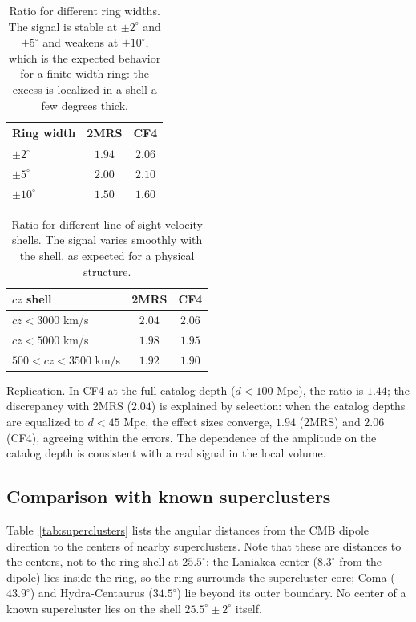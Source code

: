 \documentclass[11pt,a4paper]{article}
\begin{document}
\begin{table}[H]
\centering
\begin{tabular}{lcc}
\toprule
\textbf{Ring width} & \textbf{2MRS} & \textbf{CF4} \\
\midrule
\(\pm 2^\circ\) & \(1.94\) & \(2.06\) \\
\(\pm 5^\circ\) & \(2.00\) & \(2.10\) \\
\(\pm 10^\circ\) & \(1.50\) & \(1.60\) \\
\bottomrule
\end{tabular}
\caption{Ratio for different ring widths. The signal is stable at
\(\pm 2^\circ\) and \(\pm 5^\circ\) and weakens at \(\pm 10^\circ\), which is the
expected behavior for a finite-width ring: the excess is localized in a shell
a few degrees thick.}
\label{tab:bin}
\end{table}

\begin{table}[H]
\centering
\begin{tabular}{lcc}
\toprule
\textbf{\(cz\) shell} & \textbf{2MRS} & \textbf{CF4} \\
\midrule
\(cz < 3000\) km/s & \(2.04\) & \(2.06\) \\
\(cz < 5000\) km/s & \(1.98\) & \(1.95\) \\
\(500 < cz < 3500\) km/s & \(1.92\) & \(1.90\) \\
\bottomrule
\end{tabular}
\caption{Ratio for different line-of-sight velocity shells. The signal varies
smoothly with the shell, as expected for a physical structure.}
\label{tab:cz}
\end{table}

Replication. In CF4 at the full catalog depth (\(d < 100\) Mpc), the ratio is
\(1.44\); the discrepancy with 2MRS (\(2.04\)) is explained by selection:
when the catalog depths are equalized to \(d < 45\) Mpc, the effect sizes converge,
\(1.94\) (2MRS) and \(2.06\) (CF4), agreeing within the errors.
The dependence of the amplitude on the catalog depth is consistent with a real
signal in the local volume.

\subsection{Comparison with known superclusters}

Table~\ref{tab:superclusters} lists the angular distances from the CMB dipole
direction to the centers of nearby superclusters.
Note that these are distances to the centers, not to the ring shell at
\(25.5^\circ\): the Laniakea center (\(8.3^\circ\) from the dipole) lies inside
the ring, so the ring surrounds the supercluster core; Coma (\(43.9^\circ\))
and Hydra-Centaurus (\(34.5^\circ\)) lie beyond its outer boundary.
No center of a known supercluster lies on the shell \(25.5^\circ \pm 2^\circ\) itself.
\end{document}
